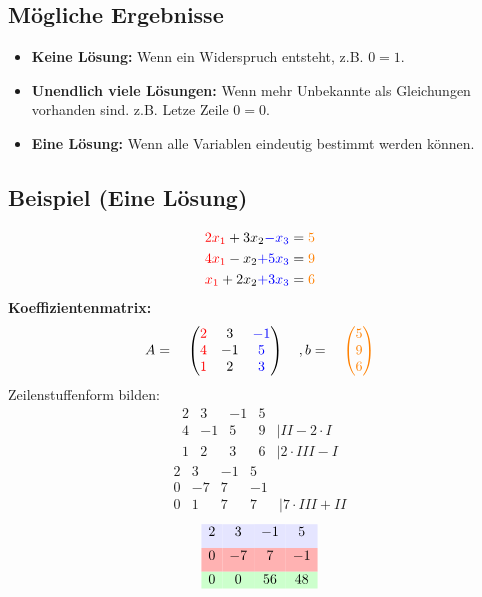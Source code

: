 \documentclass[12pt,a4paper]{article}
\begin{document}
\subsection{Mögliche Ergebnisse}
\begin{itemize}
    \item \textbf{Keine Lösung:} Wenn ein Widerspruch entsteht, z.B. $0 = 1$.
    \item \textbf{Unendlich viele Lösungen:} Wenn mehr Unbekannte als Gleichungen vorhanden sind. z.B. Letze Zeile $0 = 0$.
    \item \textbf{Eine Lösung:} Wenn alle Variablen eindeutig bestimmt werden können.
\end{itemize}
\subsection{Beispiel (Eine Lösung)}
\begin{align*}
\textcolor{red}{2x_1} + 3x_2 \textcolor{blue}{-x_3} &= \textcolor{orange}{5} \\
\textcolor{red}{4x_1} - x_2 \textcolor{blue}{+ 5x_3} &= \textcolor{orange}{9} \\
\textcolor{red}{x_1} + 2x_2 \textcolor{blue}{+ 3x_3} &= \textcolor{orange}{6}
\end{align*}
\textbf{Koeffizientenmatrix:}
\[
A =
\quad
\begin{pmatrix}
\textcolor{red}{2} & 3 & \textcolor{blue}{-1} \\
\textcolor{red}{4} & -1 & \textcolor{blue}{5} \\
\textcolor{red}{1} & 2 & \textcolor{blue}{3}
\end{pmatrix}
\quad
, b =
\quad
\textcolor{orange}{
\begin{pmatrix}
5 \\
9 \\
6
\end{pmatrix}
}
\]
Zeilenstuffenform bilden:
\[
\begin{matrix}
2 & 3 & -1 & 5 \\
4 & -1 & 5 & 9 & \vert II - 2 \cdot I \\
1 & 2 & 3 & 6 & \vert 2 \cdot III - I
\end{matrix}
\]
\[
\begin{matrix}
2 & 3 & -1 & 5 \\
0 & -7 & 7 & -1 \\
0 & 1 & 7 & 7 & \vert 7 \cdot III + II
\end{matrix}
\]
\[
\begin{array}{cccc}
\rowcolor{blue!10}
2 & 3 & -1 & 5 \\[5pt]
\rowcolor{red!30}
0 & -7 & 7 & -1 \\[5pt]
\rowcolor{green!20}
0 & 0 & 56 & 48
\end{array}
\]
\end{document}
